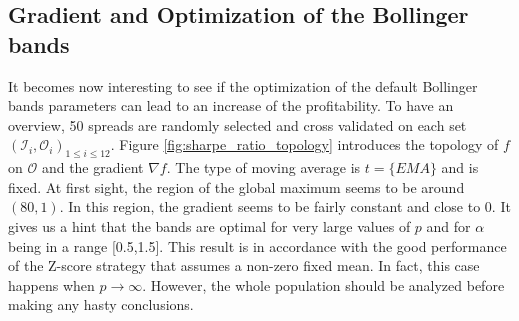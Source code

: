 \documentclass[11pt,a4,twosided,singlespacing,titlepagenumber=on]{scrreprt}
\numberwithin{equation}{chapter} %
\theoremstyle{remark}
\begin{document}
\subsection{Gradient and Optimization of the Bollinger bands}
\label{sec:optimization_bb}

It becomes now interesting to see if the optimization of the default Bollinger bands parameters can lead to an increase of the profitability. To have an overview, 50 spreads are randomly selected and cross validated on each set $(\mathcal{I}_i, \mathcal{O}_i)_{1 \leq i \leq 12}$. Figure \ref{fig:sharpe_ratio_topology} introduces the topology of $f$ on $\mathcal{O}$ and the gradient $\nabla f$. The type of moving average is $t = \{ EMA \}$ and is fixed. At first sight, the region of the global maximum seems to be around $(80,1)$. In this region, the gradient seems to be fairly constant and close to 0. It gives us a hint that the bands are optimal for very large values of $p$ and for $\alpha$ being in a range [0.5,1.5]. This result is in accordance with the good performance of the Z-score strategy that assumes a non-zero fixed mean. In fact, this case happens when $p \rightarrow \infty$. However, the whole population should be analyzed before making any hasty conclusions.
\end{document}

